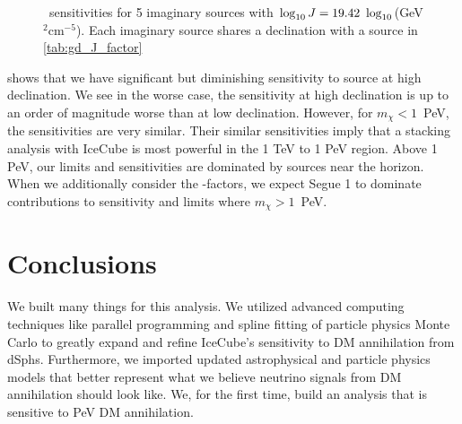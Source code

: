 \begin{figure}
    \caption{\sv~sensitivities for 5 imaginary sources with $\log_{10}J = 19.42~\log_{10}$(GeV$^2$cm$^{-5}$). Each imaginary source shares a declination with a source in \cref{tab:gd_J_factor}}
    \label{fig:icDM_dec_study}
\end{figure}

 shows that we have significant but diminishing sensitivity to source at high declination.
We see in the worse case, the sensitivity at high declination is up to an order of magnitude worse than at low declination.
However, for $m_\chi < 1$~PeV, the sensitivities are very similar.
Their similar sensitivities imply that a stacking analysis with IceCube is most powerful in the 1 TeV to 1 PeV region.
Above 1 PeV, our limits and sensitivities are dominated by sources near the horizon.
When we additionally consider the \J-factors, we expect Segue 1 to dominate contributions to sensitivity and limits where $m_\chi > 1$~PeV.

\section{Conclusions} \label{sec:icDM_conclude}

We built many things for this analysis.
We utilized advanced computing techniques like parallel programming and spline fitting of particle physics Monte Carlo to greatly expand and refine IceCube's sensitivity to DM annihilation from dSphs.
Furthermore, we imported updated astrophysical and particle physics models that better represent what we believe neutrino signals from DM annihilation should look like.
We, for the first time, build an analysis that is sensitive to PeV DM annihilation.

